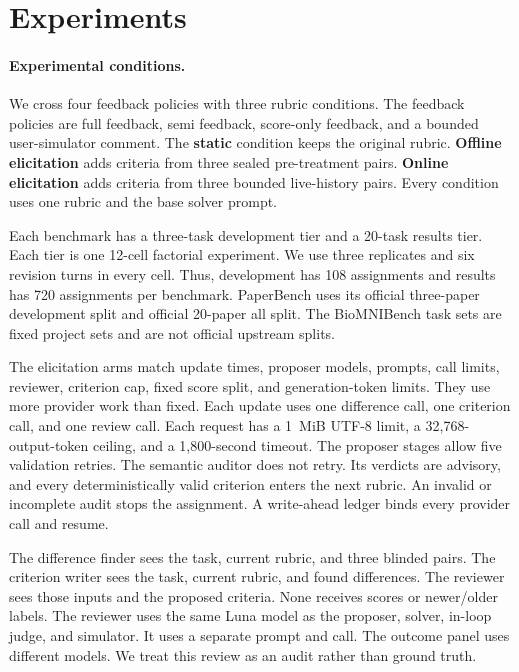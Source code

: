 \documentclass{article} %
\begin{document}
\section{Experiments}

\paragraph{Experimental conditions.}
We cross four feedback policies with three rubric conditions. The feedback
policies are full feedback, semi feedback, score-only feedback, and a bounded
user-simulator comment. The \textbf{static} condition keeps the original rubric.
\textbf{Offline elicitation} adds criteria from three sealed pre-treatment pairs.
\textbf{Online elicitation} adds criteria from three bounded live-history pairs.
Every condition uses one rubric and the base solver prompt.

Each benchmark has a three-task development tier and a 20-task results tier.
Each tier is one 12-cell factorial experiment. We use three replicates and six
revision turns in every cell. Thus, development has 108 assignments and results
has 720 assignments per benchmark. PaperBench uses its official three-paper
development split and official 20-paper all split. The BioMNIBench task sets are
fixed project sets and are not official upstream splits.

The elicitation arms match update times, proposer models, prompts, call limits,
reviewer, criterion cap, fixed score split, and generation-token limits. They use
more provider work than fixed. Each update uses one difference call, one
criterion call, and one review call. Each request has a 1~MiB UTF-8 limit, a
32,768-output-token ceiling, and a 1,800-second timeout. The proposer stages
allow five validation retries. The semantic auditor does not retry. Its verdicts
are advisory, and every deterministically valid criterion enters the next
rubric. An invalid or incomplete audit stops the assignment. A write-ahead
ledger binds every provider call and resume.

The difference finder sees the task, current rubric, and three blinded pairs.
The criterion writer sees the task, current rubric, and found differences. The
reviewer sees those inputs and the proposed criteria. None receives scores or
newer/older labels. The reviewer uses the same Luna model as the proposer,
solver, in-loop judge, and simulator. It uses a separate prompt and call. The
outcome panel uses different models. We treat this review as an audit rather
than ground truth.
\end{document}
